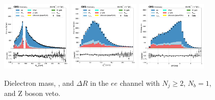 
\begin{figure}[htb!]
    \centering
    \includegraphics[width=0.3\textwidth]{chapters/Analysis/sectionPlots/figures/data_mc_overlays/ee_2016_cat_gt2_eq1_b_signal_linear_lepton_dilepton1_mass}
    \includegraphics[width=0.3\textwidth]{chapters/Analysis/sectionPlots/figures/data_mc_overlays/ee_2016_cat_gt2_eq1_b_signal_linear_lepton_dilepton1_pt}
    \includegraphics[width=0.3\textwidth]{chapters/Analysis/sectionPlots/figures/data_mc_overlays/ee_2016_cat_gt2_eq1_b_signal_linear_lepton_dilepton1_delta_r}
    \caption{Dielectron mass, \pt, and $\Delta R$ in the $ee$ channel
    with $N_{j} \geq 2$, $N_{b} = 1$, and Z boson veto.}
    \label{fig:analysis:plots:ee_1_dilepton}
\end{figure}

